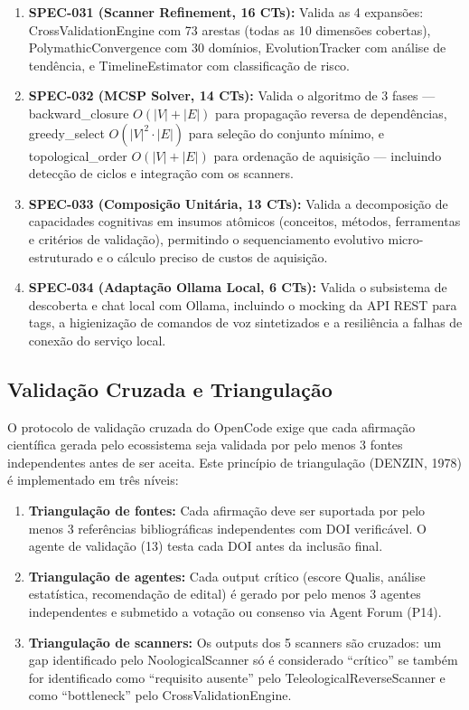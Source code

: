 \begin{enumerate}
  \item \textbf{SPEC-031 (Scanner Refinement, 16 CTs):} Valida as 4 expansões: CrossValidationEngine com 73 arestas (todas as 10 dimensões cobertas), PolymathicConvergence com 30 domínios, EvolutionTracker com análise de tendência, e TimelineEstimator com classificação de risco.

  \item \textbf{SPEC-032 (MCSP Solver, 14 CTs):} Valida o algoritmo de 3 fases --- backward\_closure $O(|V|+|E|)$ para propagação reversa de dependências, greedy\_select $O(|V|^2 \cdot |E|)$ para seleção do conjunto mínimo, e topological\_order $O(|V|+|E|)$ para ordenação de aquisição --- incluindo detecção de ciclos e integração com os scanners.

  \item \textbf{SPEC-033 (Composição Unitária, 13 CTs):} Valida a decomposição de capacidades cognitivas em insumos atômicos (conceitos, métodos, ferramentas e critérios de validação), permitindo o sequenciamento evolutivo micro-estruturado e o cálculo preciso de custos de aquisição.

  \item \textbf{SPEC-034 (Adaptação Ollama Local, 6 CTs):} Valida o subsistema de descoberta e chat local com Ollama, incluindo o mocking da API REST para tags, a higienização de comandos de voz sintetizados e a resiliência a falhas de conexão do serviço local.
\end{enumerate}

\subsection{Validação Cruzada e Triangulação}

O protocolo de validação cruzada do OpenCode exige que cada afirmação científica gerada pelo ecossistema seja validada por pelo menos 3 fontes independentes antes de ser aceita. Este princípio de triangulação (DENZIN, 1978) é implementado em três níveis:

\begin{enumerate}
  \item \textbf{Triangulação de fontes:} Cada afirmação deve ser suportada por pelo menos 3 referências bibliográficas independentes com DOI verificável. O agente de validação (13) testa cada DOI antes da inclusão final.
  \item \textbf{Triangulação de agentes:} Cada output crítico (escore Qualis, análise estatística, recomendação de edital) é gerado por pelo menos 3 agentes independentes e submetido a votação ou consenso via Agent Forum (P14).
  \item \textbf{Triangulação de scanners:} Os outputs dos 5 scanners são cruzados: um gap identificado pelo NoologicalScanner só é considerado ``crítico'' se também for identificado como ``requisito ausente'' pelo TeleologicalReverseScanner e como ``bottleneck'' pelo CrossValidationEngine.
\end{enumerate}

